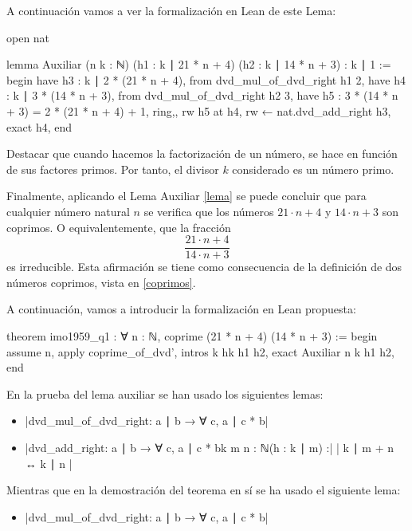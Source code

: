 A continuación vamos a ver la formalización en Lean de este Lema:

\begin{leancode}
open nat

lemma Auxiliar
  (n k : ℕ)
  (h1 : k ∣ 21 * n + 4)
  (h2 : k ∣ 14 * n + 3)
  : k ∣ 1 :=
begin
  have h3 : k ∣ 2 * (21 * n + 4), from dvd_mul_of_dvd_right h1 2,
  have h4 : k ∣ 3 * (14 * n + 3), from dvd_mul_of_dvd_right h2 3,
  have h5 : 3 * (14 * n + 3) = 2 * (21 * n + 4) + 1,
  { ring,},
  rw h5 at h4,
  rw ←  nat.dvd_add_right h3,
  exact h4,
end
\end{leancode}

Destacar que cuando hacemos la factorización de un número, se hace en
función de sus factores primos. Por tanto, el divisor \(k\) considerado
es un número primo.

Finalmente, aplicando el Lema Auxiliar \ref{lema} se puede concluir que para
cualquier número natural \(n\) se verifica que los números \(21⋅n+4\)
y \(14⋅n+3\) son coprimos. O equivalentemente, que la fracción
\begin{equation*}
  \frac{21⋅n+4}{14⋅n+3}
\end{equation*}
es irreducible. Esta afirmación se tiene como consecuencia de la
definición de dos números coprimos, vista en \ref{coprimos}.

A continuación, vamos a introducir la formalización en Lean propuesta:

\begin{leancode}
theorem imo1959_q1 : ∀ n : ℕ, coprime (21 * n + 4) (14 * n + 3) :=
begin
  assume n,
  apply coprime_of_dvd',
  intros k hk h1 h2,
  exact Auxiliar n k h1 h2,
end
\end{leancode}


En la prueba del lema auxiliar se han usado los siguientes lemas:
\begin{itemize}
\item {}|dvd_mul_of_dvd_right: a ∣ b → ∀ c, a ∣ c * b|
\item {}|dvd_add_right: a ∣ b → ∀ c, a ∣ c * b{k m n : ℕ}(h : k ∣ m) :|
  | k ∣ m + n ↔ k ∣ n |
\end{itemize}

Mientras que en la demostración del teorema en sí se ha usado el
siguiente lema:
\begin{itemize}
\item {}|dvd_mul_of_dvd_right: a ∣ b → ∀ c, a ∣ c * b|
\end{itemize}



